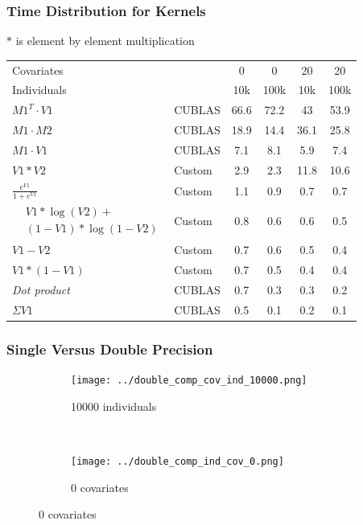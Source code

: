 \documentclass{beamer}
\newcommand{\squeezeup}{\vspace{0mm}}
\begin{document}
\begin{frame}
\frametitle{Time Distribution for Kernels}

{\tiny $*$ is element by element multiplication}

\squeezeup

\begin{table}[h]
\centering
\begin{tabular}{| l | l | c | c | c | c |}
  \hline
  Covariates & & 0 & 0 & 20 & 20 \\
  Individuals & & 10k & 100k & 10k  & 100k  \\
  \hline
  $M1^T \cdot V1$ & CUBLAS & 66.6 & 72.2 & 43 & 53.9\\
  $M1 \cdot M2$ & CUBLAS & 18.9 & 14.4 & 36.1 & 25.8\\
  $M1 \cdot V1$ & CUBLAS & 7.1 & 8.1 & 5.9 & 7.4\\
  $V1 * V2$ & Custom & 2.9 & 2.3 & 11.8 & 10.6\\
  $\frac{e^{V1}}{1+e^{V1}}$ & Custom & 1.1 & 0.9 & 0.7 & 0.7\\
  
{$\begin{aligned}
& V1*\log(V2)+\\
& (1-V1)*\log(1-V2)
\end{aligned}$}
  & Custom & 0.8 & 0.6 & 0.6 & 0.5\\
    
  $V1 - V2$ & Custom & 0.7 & 0.6 & 0.5 & 0.4\\
  $V1*(1-V1)$ & Custom & 0.7 & 0.5 & 0.4 & 0.4\\
  \emph{Dot product} & CUBLAS & 0.7 & 0.3 & 0.3 & 0.2\\
  $\Sigma V1$ & CUBLAS & 0.5 & 0.1 & 0.2 & 0.1\\
  \hline  
\end{tabular}
\end{table}

\end{frame}


\begin{frame}
\frametitle{Single Versus Double Precision}

\begin{figure}
        \centering
        \begin{subfigure}[b]{0.48\textwidth}
        \centering
                \texttt{[image: ../double\_comp\_cov\_ind\_10000.png]}
                \caption*{10000 individuals}
        \end{subfigure}%
        ~
        \begin{subfigure}[b]{0.48\textwidth}
        \centering
                \texttt{[image: ../double\_comp\_ind\_cov\_0.png]}
                \caption*{0 covariates}
        \end{subfigure}
\end{figure}

\end{frame}
\end{document}
